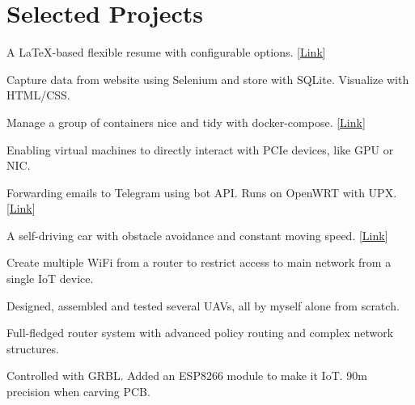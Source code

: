 \documentclass[letterpaper,11pt]{article}
\newcommand{\resumeSubHeadingListStart}{\begin{itemize}[leftmargin=0pt,label={}]}
\newcommand{\resumeSubHeadingListEnd}{\end{itemize}}
\begin{document}
\section{Selected Projects}{
    \resumeSubHeadingListStart
        {A \LaTeX-based flexible resume with configurable options. [\href{https://github.com/ly4096x/Flexible\_Resume}{\underline{Link}}]}{}

        {Capture data from website using Selenium and store with SQLite. Visualize with HTML/CSS.}{}

        {Manage a group of containers nice and tidy with docker-compose. [\href{https://github.com/ly4096x/ECE6383\_HSN\_Lab4\_Network}{\underline{Link}}]}{}

        {Enabling virtual machines to directly interact with PCIe devices, like GPU or NIC.}{}

        {Forwarding emails to Telegram using bot API. Runs on OpenWRT with UPX. [\href{https://github.com/ly4096x/smtp\_to\_telegram}{\underline{Link}}]}{}

        {A self-driving car with obstacle avoidance and constant moving speed. [\href{https://github.com/ly4096x/RTES\_STM32F4}{\underline{Link}}]}{}

        {Create multiple WiFi from a router to restrict access to main network from a single IoT device.}{}

        {Designed, assembled and tested several UAVs, all by myself alone from scratch.}{}

        {Full-fledged router system with advanced policy routing and complex network structures.}{}

        {Controlled with GRBL. Added an ESP8266 module to make it IoT. 90{\textmu}m precision when carving PCB.}{}
    \resumeSubHeadingListEnd
}
\fi

\end{document}
